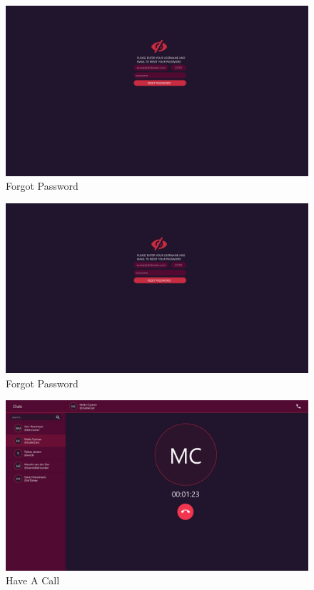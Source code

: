 \begin{figure}[h]
    \centering
    \includegraphics[width=1.0\textwidth]{./graphics/wireframes/ForgotPassword}
    \caption{Forgot Password}
    \label{fig:figure17}
\end{figure}

\begin{figure}[h]
    \centering
    \includegraphics[width=1.0\textwidth]{./graphics/wireframes/ForgotPassword}
    \caption{Forgot Password}
    \label{fig:figure18}
\end{figure}

\begin{figure}[h]
    \centering
    \includegraphics[width=1.0\textwidth]{./graphics/wireframes/HaveACall}
    \caption{Have A Call}
    \label{fig:figure19}
\end{figure}

